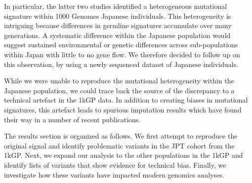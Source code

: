 \documentclass[9pt,lineno]{elife}
\begin{document}
 In particular, the latter two studies  identified a heterogeneous mutational signature within 1000 Genomes Japanese individuals.
This heterogeneity is intriguing because differences in germline signatures accumulate over many generations.
A systematic difference within the Japanese population would suggest sustained environmental or genetic differences across sub-populations within Japan with little to no gene flow.
We therefore decided to follow up on this observation, by using a newly sequenced dataset of Japanese individuals. 

While we were unable to reproduce the mutational heterogeneity within the Japanese population, we could trace back the source of the discrepancy to a technical artefact in the 1kGP data.
In addition to creating biases in mutational signatures, this artefact leads to spurious imputation results which have found their way in a number of recent publications.


The results section is organized as follows.
We first attempt to reproduce the original signal and identify problematic variants in the JPT cohort from the 1kGP. 
Next, we expand our analysis to the other populations in the 1kGP and identify lists of variants that show evidence for technical bias.
Finally, we investigate how these variants have impacted modern genomics analyses.  
  
\end{document}
